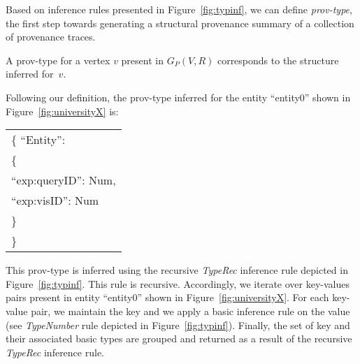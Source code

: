 Based on inference rules presented in Figure~\ref{fig:typinf}, we can define {\emph{prov-type}}, the first step towards generating a structural provenance summary of a collection of provenance traces.
\begin{definition}
\label{def:prov-type}
A prov-type for a vertex $v$ present in $G_P(V, R)$ corresponds to the structure inferred for~$v$.
\end{definition}

\begin{example}
Following our definition, the prov-type inferred for the entity ``entity0'' shown in Figure~\ref{fig:universityX} is:
\begin{center}
\small
\begin{adjustbox}{width=0.4\columnwidth,center}
\begin{tabular}{l}
\{ ``Entity'': \\
\hspace{0.5cm}	\{ \\
\hspace{0.5cm}\hspace{0.5cm}	``exp:queryID'': Num, \\
\hspace{0.5cm}\hspace{0.5cm}	``exp:visID'': Num \\
\hspace{0.5cm}	\} \\
\}
\end{tabular}
\end{adjustbox}
\end{center}
This prov-type is inferred using the recursive \emph{TypeRec} inference rule depicted in Figure~\ref{fig:typinf}. This rule is recursive. Accordingly, we iterate over key-values pairs present in entity ``entity0'' shown in Figure~\ref{fig:universityX}. For each key-value pair, we maintain the key and we apply a basic inference rule on the value (see \emph{TypeNumber} rule depicted in Figure~\ref{fig:typinf}).  Finally, the set of key and their associated basic types are grouped and returned as a result of the recursive \emph{TypeRec} inference rule.

\end{example}

